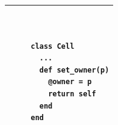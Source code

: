 \documentclass[a4wide, 11pt]{article}
\begin{document}
\begin{center}
\begin{tabular}{ | l | l |}
\begin{minipage}{110mm}
\begin{scriptsize}
\begin{verbatim}
        \end{verbatim}
      \end{scriptsize}
    \end{minipage}
    &
    \begin{minipage}{40mm}
      \begin{scriptsize}
        \begin{verbatim}
          
          
   class Cell
     ...
     def set_owner(p)
       @owner = p
       return self
     end
   end

        \end{verbatim}
      \end{scriptsize}
    \end{minipage}
    \\
    \hline

  \end{tabular}
\end{center}
\end{document}
